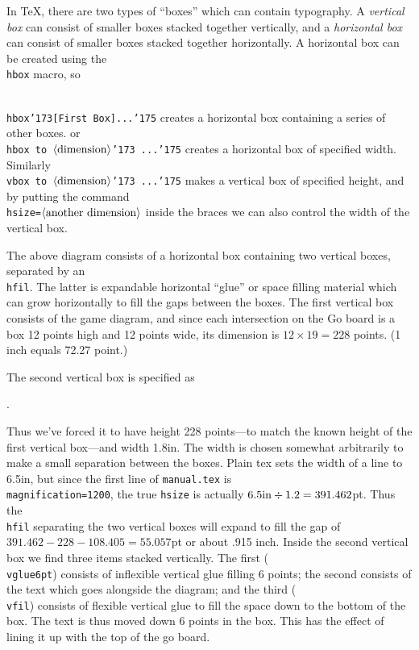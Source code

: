 In \TeX, there are two types of ``boxes'' which can contain typography. A {\it
vertical box} can consist of smaller boxes stacked together vertically, and a
{\it horizontal box} can consist of smaller boxes stacked together
horizontally. A horizontal box can be created using the {\tt\\hbox} macro,
so 

\vfil
{\tt\\hbox\char'173{\rm [First Box] ...}\char'175}
\vfil\noindent
creates a horizontal box containing a series of other boxes. or 
{\tt\\hbox to $\left<\hbox{\rm dimension}\right>$\char'173 ...\char'175}
creates a horizontal
box of specified width. Similarly
{\tt\\vbox to $\left<\hbox{\rm dimension}\right>$\char'173 ...\char'175} makes
a vertical box of specified height, and by putting the command
{\tt\\hsize=$\left<\hbox{\rm another dimension}\right>$} inside the braces we
can also control the width of the vertical box.

The above diagram consists of a horizontal box containing two vertical boxes,
separated by an {\tt\\hfil}. The latter is expandable horizontal ``glue'' or
space filling material which can grow horizontally to fill the gaps between
the boxes. The first vertical box consists of the game diagram, and since each
intersection on the Go board is a box 12 points high and 12 points wide, its
dimension is $12\times19=228$ points. (1 inch equals 72.27 point.)

The second vertical box is specified as

\vfil
\centerline{.}
\vfil

Thus we've forced it to have height 228 points---to match the known height of
the first vertical box---and width 1.8in. The width is chosen somewhat 
arbitrarily to make a small separation between the boxes. Plain tex sets
the width of a line to 6.5in, but since the first line of {\tt manual.tex} is
{\tt\\magnification=1200}, the true {\tt hsize} is actually 
$6.5{\rm in}\div1.2=391.462$pt. Thus the {\tt\\hfil} separating the two
vertical boxes will expand to fill the gap of $391.462-228-108.405=55.057$pt or
about .915 inch. Inside the second vertical box we find three items 
stacked vertically. The first ({\tt\\vglue6pt}) consists of inflexible vertical
glue filling 6 points; the second consists of the text which goes alongside
the diagram; and the third ({\tt\\vfil}) consists of flexible vertical glue to
fill the space down to the bottom of the box.  The text is thus moved down 6
points in the box. This has the effect of lining it up with the top of the go
board.

